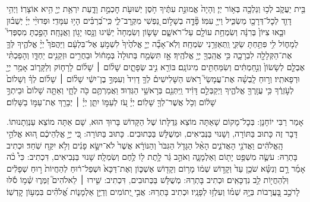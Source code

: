 \documentclass[twoside, openany, parskip=half, 11pt]{book}
\begin{document}
\begin{footnotesize}
%
בֵּ֖ית יַעֲקֹ֑ב לְכ֥וּ וְנֵלְכָ֖ה בְּא֥וֹר יְיָ׃
%
וְהָיָה֙ אֱמוּנַ֣ת עִתֶּ֔יךָ חֹ֥סֶן יְשׁוּעֹ֖ת חׇכְמַ֣ת וָדָ֑עַת יִרְאַ֥ת יְיָ֖ הִ֥יא אוֹצָרֽוֹ׃
%
וַיְהִ֥י דָוִ֛ד לְכׇל־דְּרָכָ֖ו מַשְׂכִּ֑יל וַייָ֖ עִמּֽוֹ׃
%
פָּ֘דָ֤ה בְשָׁל֣וֹם נַ֭פְשִׁי מִקְּרׇב־לִ֑י כִּֽי־בְ֝רַבִּ֗ים הָי֥וּ עִמָּדִֽי׃
%
%
וּפְדוּיֵ֨י יְיָ֜ יְשֻׁב֗וּן וּבָ֤אוּ צִיּוֹן֙ בְּרִנָּ֔ה וְשִׂמְחַ֥ת עוֹלָ֖ם עַל־רֹאשָׁ֑ם שָׂשׂ֤וֹן וְשִׂמְחָה֙ יַשִּׂ֔יגוּ וְנָ֖סוּ יָג֥וֹן וַאֲנָחָֽה׃
%
הָפַ֣כְתָּ מִסְפְּדִי֮ לְמָח֢וֹל לִ֥י פִּתַּ֥חְתָּ שַׂקִּ֑י וַֽתְּאַזְּרֵ֥נִי שִׂמְחָֽה׃
%
וְלֹֽא־אָבָ֞ה יְיָ֤ אֱלֹהֶ֙יךָ֙ לִשְׁמֹ֣עַ אֶל־בִּלְעָ֔ם וַיַּהֲפֹךְ֩ יְיָ֨ אֱלֹהֶ֧יךָ לְּךָ֛ אֶת־הַקְּלָלָ֖ה לִבְרָכָ֑ה כִּ֥י אֲהֵֽבְךָ֖ יְיָ֥ אֱלֹהֶֽיךָ׃
%
אָ֣ז תִּשְׂמַ֤ח בְּתוּלָה֙ בְּמָח֔וֹל וּבַחֻרִ֥ים וּזְקֵנִ֖ים יַחְדָּ֑ו וְהָפַכְתִּ֨י אֶבְלָ֤ם לְשָׂשׂוֹן֙ וְנִ֣חַמְתִּ֔ים וְשִׂמַּחְתִּ֖ים מִיגוֹנָֽם׃
%
בּוֹרֵ֖א נִ֣יב שְׂפָתָ֑יִם שָׁל֨וֹם ׀ שָׁל֜וֹם לָרָח֧וֹק וְלַקָּר֛וֹב אָמַ֥ר יְיָ֖ וּרְפָאתִֽיו׃
%
וְר֣וּחַ לָֽבְשָׁ֗ה אֶת־עֲמָשַׂי֮ רֹ֣אשׁ הַשָּׁלִישִׁים֒ לְךָ֤ דָוִיד֙ וְעִמְּךָ֣ בֶן־יִשַׁ֔י שָׁל֨וֹם ׀ שָׁל֜וֹם לְךָ֗ וְשָׁלוֹם֙ לְעֹ֣זְרֶ֔ךָ כִּ֥י עֲזָֽרְךָ֖ אֱלֹהֶ֑יךָ וַיְקַבְּלֵ֣ם דָּוִ֔יד וַֽיִּתְּנֵ֖ם בְּרָאשֵׁ֥י הַגְּדֽוּד׃
%
וַאֲמַרְתֶּ֥ם כֹּ֖ה לֶחָ֑י וְאַתָּ֤ה שָׁלוֹם֙ וּבֵיתְךָ֣ שָׁל֔וֹם וְכֹ֥ל אֲשֶׁר־לְךָ֖ שָׁלֽוֹם׃
%
יְיָ֗ עֹ֭ז לְעַמּ֣וֹ יִתֵּ֑ן יְיָ֓ ׀ יְבָרֵ֖ךְ אֶת־עַמּ֣וֹ בַשָּׁלֽוֹם׃

%
אָמַר רַבִּי יוֹחָנָן: בְּכׇל־מָקוֹם שָׁאַתָּה מוֹצֵא גְּדֻלָּתוֹ שֶׁל הַקָּדוֹשׁ בָּרוּךְ הוּא, שָׁם אַתָּה מוֹצֵא עַנְוְתָנוּתוֹ. דָּבָר זֶה כָּתוּב בַּתּוֹרָה, וְשָׁנוּי בַּנְּבִיאִים, וּמְשֻׁלָּשׁ בַּכְּתוּבִים. כָּתוּב בַּתּוֹרָה:%
כִּ֚י יְיָ֣ אֱלֹֽהֵיכֶ֔ם ה֚וּא אֱלֹהֵ֣י הָֽאֱלֹהִ֔ים וַאֲדֹנֵ֖י הָאֲדֹנִ֑ים הָאֵ֨ל הַגָּדֹ֤ל הַגִּבֹּר֙ וְהַנּוֹרָ֔א אֲשֶׁר֙ לֹא־יִשָּׂ֣א פָנִ֔ים וְלֹ֥א יִקַּ֖ח שֹֽׁחַד׃
וּכְתִיב בָּתְרֵהּ:
עֹשֶׂ֛ה מִשְׁפַּ֥ט יָת֖וֹם וְאַלְמָנָ֑ה וְאֹהֵ֣ב גֵּ֔ר לָ֥תֶת ל֖וֹ לֶ֥חֶם וְשִׂמְלָֽה׃
שָׁנוּי בַּנְּבִיאִים, דִּכְתִיב:%
כִּי֩ כֹ֨ה אָמַ֜ר רָ֣ם וְנִשָּׂ֗א שֹׁכֵ֥ן עַד֙ וְקָד֣וֹשׁ שְׁמ֔וֹ מָר֥וֹם וְקָד֖וֹשׁ אֶשְׁכּ֑וֹן וְאֶת־דַּכָּא֙ וּשְׁפַל־ר֔וּחַ לְהַחֲיוֹת֙ ר֣וּחַ שְׁפָלִ֔ים וּֽלְהַחֲי֖וֹת לֵ֥ב נִדְכָּאִֽים׃
וּכְתִיב בָּתְרֵהּ:
מְשֻׁלָּשׁ בַּכְּתוּבִים, דִּכְתִיב:%
שִׁ֤ירוּ ׀ לֵאלֹהִים֮ זַמְּר֢וּ שְׁ֫מ֥וֹ סֹ֡לּוּ לָרֹכֵ֣ב בָּ֭עֲרָבוֹת בְּיָ֥הּ שְׁמ֗וֹ וְעִלְז֥וּ לְפָנָֽיו׃
וּכְתִיב בָּתְרֵהּ:
אֲבִ֣י יְ֭תוֹמִים וְדַיַּ֣ן אַלְמָנ֑וֹת אֱ֝לֹהִ֗ים בִּמְע֥וֹן קׇדְשֽׁוֹ׃


\end{footnotesize}
\end{document}
